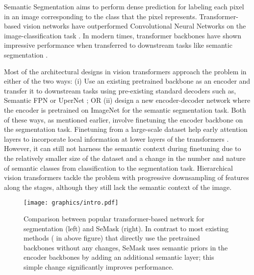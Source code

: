 \documentclass[10pt,twocolumn,letterpaper]{article}
\newcommand{\vspaceunderfigext}{\vspace{-0.7cm}}
\begin{document}
Semantic Segmentation aims to perform dense prediction for labeling each pixel in an image corresponding to the class that the pixel represents. Transformer-based vision networks \cite{vit,deit} have outperformed Convolutional Neural Networks on the image-classification task \cite{imagenet}. In modern times, transformer backbones have shown impressive performance when transferred to downstream tasks like semantic segmentation \cite{beit, fapn, swin-T}. 

Most of the architectural designs in vision transformers approach the problem in either of the two ways: (i) Use an existing pretrained backbone as an encoder and transfer it to downstream tasks using pre-existing standard decoders such as, Semantic FPN \cite{sem-fpn} or UperNet \cite{upernet}; OR (ii) design a new encoder-decoder network where the encoder is pretrained on ImageNet for the semantic segmentation task. Both of these ways, as mentioned earlier, involve finetuning the encoder backbone on the segmentation task. Finetuning from a large-scale dataset help early attention layers to incorporate local information at lower layers of the transformers \cite{vit-cnn}. However, it can still not harness the semantic context during finetuning due to the relatively smaller size of the dataset and a change in the number and nature of semantic classes from classification to the segmentation task. Hierarchical vision transformers \cite{segformer,swin-T} tackle the problem with progressive downsampling of features along the stages, although they still lack the semantic context of the image.



\begin{figure}
  \centering
\texttt{[image: graphics/intro.pdf]}
  \vspaceunderfigext
  \caption{
      Comparison between popular transformer-based network for segmentation (left) and SeMask (right). In contrast to most existing methods (\cite{swin-T} in above figure) that directly use the pretrained backbones without any changes, SeMask uses semantic priors in the encoder backbones by adding an additional semantic layer; this simple change significantly improves performance.
      }
  \label{fig:intro}
\end{figure}
\end{document}
